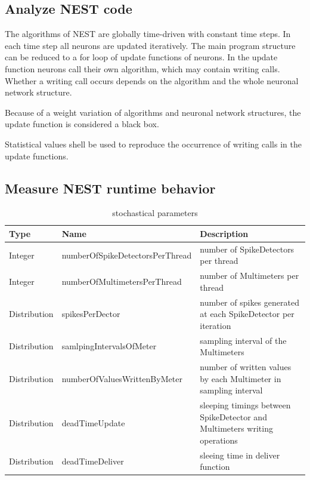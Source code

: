 \documentclass[]{YIC2015}
\begin{document}
\subsection{Analyze NEST code}
The algorithms of NEST are globally time-driven with constant time steps.
In each time step all neurons are updated iteratively.
The main program structure can be reduced to a for loop of update functions of neurons.
In the update function neurons call their own algorithm, which may contain writing calls.
Whether a writing call occurs depends on the algorithm and the whole neuronal network structure.

Because of a weight variation of algorithms and neuronal network structures, the update function is considered a black box.

Statistical values shell be used to reproduce the occurrence of writing calls in the update functions.

\subsection{Measure NEST runtime behavior}

\begin{table}[htdp]
\caption{stochastical parameters}
\centering
\begin{tabular}{lll}
\hline\hline
\textbf{Type} & \textbf{Name} & \textbf{Description} \\ \hline
Integer &   numberOfSpikeDetectorsPerThread & number of SpikeDetectors per thread  \\
Integer &   numberOfMultimetersPerThread & number of Multimeters per thread  \\
Distribution &   spikesPerDector & number of spikes generated at each SpikeDetector per iteration  \\
Distribution &   samlpingIntervalsOfMeter & sampling interval of the Multimeters  \\
Distribution &   numberOfValuesWrittenByMeter & number of written values by each Multimeter in sampling interval  \\
Distribution  &  deadTimeUpdate & sleeping timings between SpikeDetector and Multimeters writing operations \\
Distribution &   deadTimeDeliver & sleeing time in deliver function  \\
\hline\hline
\end{tabular}
\label{tab:table-silva1}
\end{table}

\end{document}
